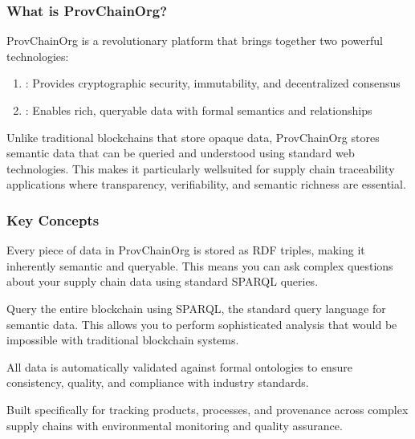 \documentclass[letterpaper,10pt,english]{sphinxmanual}
\begin{document}
\subsubsection{What is ProvChainOrg?}
\label{\detokenize{user-guide/introduction:what-is-provchainorg}}
\sphinxAtStartPar
ProvChainOrg is a revolutionary platform that brings together two powerful technologies:
\begin{enumerate}
%
\item {} 
\sphinxAtStartPar
{}: Provides cryptographic security, immutability, and decentralized consensus

\item {} 
\sphinxAtStartPar
{}: Enables rich, queryable data with formal semantics and relationships

\end{enumerate}

\sphinxAtStartPar
Unlike traditional blockchains that store opaque data, ProvChainOrg stores semantic data that can be queried and understood using standard web technologies. This makes it particularly well\sphinxhyphen{}suited for supply chain traceability applications where transparency, verifiability, and semantic richness are essential.


\subsubsection{Key Concepts}
\label{\detokenize{user-guide/introduction:key-concepts}}\begin{description}
\sphinxAtStartPar
Every piece of data in ProvChainOrg is stored as RDF triples, making it inherently semantic and queryable. This means you can ask complex questions about your supply chain data using standard SPARQL queries.

\sphinxAtStartPar
Query the entire blockchain using SPARQL, the standard query language for semantic data. This allows you to perform sophisticated analysis that would be impossible with traditional blockchain systems.

\sphinxAtStartPar
All data is automatically validated against formal ontologies to ensure consistency, quality, and compliance with industry standards.

\sphinxAtStartPar
Built specifically for tracking products, processes, and provenance across complex supply chains with environmental monitoring and quality assurance.

\end{description}
\end{document}
